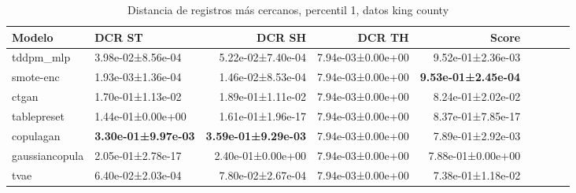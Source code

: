 \begin{table}[H]
\centering
\fontsize{10}{14}\selectfont
\caption{Distancia de registros más cercanos, percentil 1, datos king county}
\label{table-nndr-king county-a}
\begin{tabular}{|l|l|r|r|r|r|r|r|r|}
\hline
\rowcolor[gray]{0.8}
Modelo & DCR ST & DCR SH & DCR TH & \textbf{Score} \\
\hline tddpm\_mlp & 3.98e-02±8.56e-04 & 5.22e-02±7.40e-04 & 7.94e-03±0.00e+00 & 9.52e-01±2.36e-03 \\
\hline smote-enc & \cellcolor[rgb]{0.9, 0.54, 0.52} 1.93e-03±1.36e-04 & \cellcolor[rgb]{0.9, 0.54, 0.52} 1.46e-02±8.53e-04 & 7.94e-03±0.00e+00 & \bfseries 9.53e-01±2.45e-04 \\
\hline ctgan & 1.70e-01±1.13e-02 & 1.89e-01±1.11e-02 & 7.94e-03±0.00e+00 & 8.24e-01±2.02e-02 \\
\hline tablepreset & 1.44e-01±0.00e+00 & 1.61e-01±1.96e-17 & 7.94e-03±0.00e+00 & 8.37e-01±7.85e-17 \\
\hline copulagan & \bfseries 3.30e-01±9.97e-03 & \bfseries 3.59e-01±9.29e-03 & 7.94e-03±0.00e+00 & 7.89e-01±2.92e-03 \\
\hline gaussiancopula & 2.05e-01±2.78e-17 & 2.40e-01±0.00e+00 & 7.94e-03±0.00e+00 & 7.88e-01±0.00e+00 \\
\hline tvae & 6.40e-02±2.03e-04 & 7.80e-02±2.67e-04 & 7.94e-03±0.00e+00 & \cellcolor[rgb]{0.9, 0.54, 0.52} 7.38e-01±1.18e-02 \\
\hline
\end{tabular}
\end{table}
